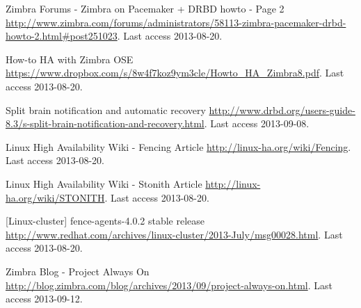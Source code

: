 \begin{thebibliography}{1}

 Zimbra Forums - Zimbra on Pacemaker + DRBD howto - Page 2
\url{http://www.zimbra.com/forums/administrators/58113-zimbra-pacemaker-drbd-howto-2.html#post251023}. Last access 2013-08-20.

 How-to HA with Zimbra OSE
\url{https://www.dropbox.com/s/8w4f7koz9ym3cle/Howto_HA_Zimbra8.pdf}. Last access 2013-08-20.

 Split brain notification and automatic recovery
\url{http://www.drbd.org/users-guide-8.3/s-split-brain-notification-and-recovery.html}. Last access 2013-09-08.


 Linux High Availability Wiki - Fencing Article
\url{http://linux-ha.org/wiki/Fencing}. Last access 2013-08-20.

 Linux High Availability Wiki - Stonith Article
\url{http://linux-ha.org/wiki/STONITH}. Last access 2013-08-20.

 [Linux-cluster] fence-agents-4.0.2 stable release
\url{http://www.redhat.com/archives/linux-cluster/2013-July/msg00028.html}. Last access 2013-08-20.

 Zimbra Blog - Project Always On
\url{http://blog.zimbra.com/blog/archives/2013/09/project-always-on.html}. Last access 2013-09-12.


\end{thebibliography}

